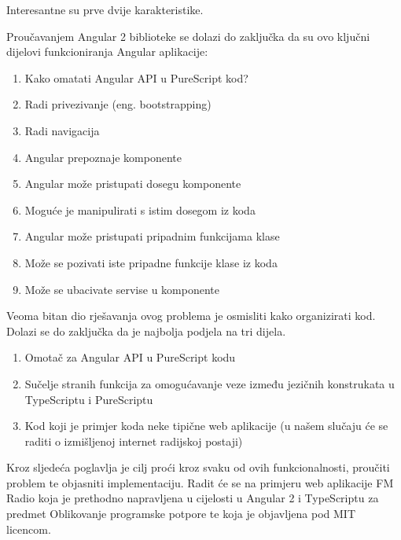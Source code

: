 \documentclass[times, utf8, zavrsni]{fer}
\begin{document}
Interesantne su prve dvije karakteristike.

Proučavanjem Angular 2 biblioteke se dolazi do zaključka da su ovo ključni dijelovi funkcioniranja Angular aplikacije:

\begin{enumerate}
\item Kako omatati Angular API u PureScript kod?
\item Radi privezivanje (eng. bootstrapping)
\item Radi navigacija
\item Angular prepoznaje komponente
\item Angular može pristupati dosegu komponente
\item Moguće je manipulirati s istim dosegom iz koda
\item Angular može pristupati pripadnim funkcijama klase
\item Može se pozivati iste pripadne funkcije klase iz koda
\item Može se ubacivate servise u komponente
\end{enumerate}

Veoma bitan dio rješavanja ovog problema je osmisliti kako organizirati kod. Dolazi se do zaključka da je najbolja podjela na tri dijela.
\begin{enumerate}
\item Omotač za Angular API u PureScript kodu
\item Sučelje stranih funkcija za omogućavanje veze između jezičnih konstrukata u TypeScriptu i PureScriptu
\item Kod koji je primjer koda neke tipične web aplikacije (u našem slučaju će se raditi o izmišljenoj internet radijskoj postaji)
\end{enumerate}

Kroz sljedeća poglavlja je cilj proći kroz svaku od ovih funkcionalnosti, proučiti problem te objasniti implementaciju. Radit će se na primjeru web aplikacije FM Radio koja je prethodno napravljena u cijelosti u Angular 2 i TypeScriptu za predmet Oblikovanje programske potpore te koja je objavljena pod MIT licencom.
\end{document}
